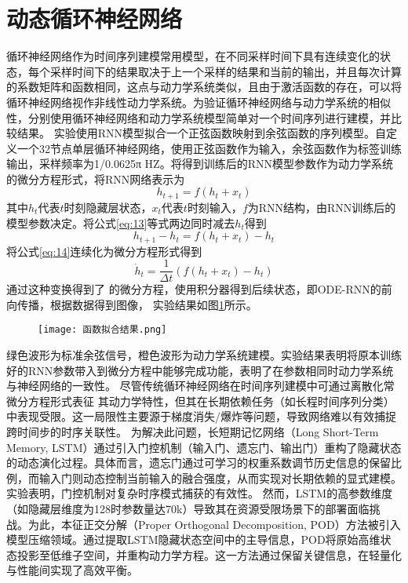 \section{动态循环神经网络}
循环神经网络作为时间序列建模常用模型，在不同采样时间下具有连续变化的状态，每个采样时间下的结果取决于上一个采样的结果和当前的输出，并且每次计算的系数矩阵和函数相同，这点与动力学系统类似，且由于激活函数的存在，可以将循环神经网络视作非线性动力学系统。为验证循环神经网络与动力学系统的相似性，分别使用循环神经网络和动力学系统模型简单对一个时间序列进行建模，并比较结果。
实验使用RNN模型拟合一个正弦函数映射到余弦函数的序列模型。自定义一个32节点单层循环神经网络，使用正弦函数作为输入，余弦函数作为标签训练输出，采样频率为1/0.0625π HZ。将得到训练后的RNN模型参数作为动力学系统的微分方程形式，将RNN网络表示为
\begin{equation}
\label{eq:13}
{h_{t + 1}} = f({h_t} + {x_t})
\end{equation}
其中$h_t$代表$t$时刻隐藏层状态，$x_t$代表$t$时刻输入，$f$为RNN结构，由RNN训练后的模型参数决定。将公式\ref{eq:13}等式两边同时减去$h_t$得到
\begin{equation}
\label{eq:14}
{h_{t + 1}} - {h_t} = f({h_t} + {x_t}) - {h_t}
\end{equation}
将公式\ref{eq:14}连续化为微分方程形式得到
\begin{equation}
\label{eq:15}
  {\dot h_t} = \frac{1}{{\Delta t}}(f({h_t} + {x_t}) - {h_t})
\end{equation}
通过这种变换得到了 的微分方程，使用积分器得到后续状态，即ODE-RNN的前向传播，根据数据得到图像， 实验结果如图\ref{fig:函数拟合结果}所示。
\begin{figure}[!htbp]
  \centering
  \texttt{[image: 函数拟合结果.png]}
  \label{fig:函数拟合结果}
\end{figure}
绿色波形为标准余弦信号，橙色波形为动力学系统建模。实验结果表明将原本训练好的RNN参数带入到微分方程中能够完成功能，表明了在参数相同时动力学系统与神经网络的一致性。
尽管传统循环神经网络在时间序列建模中可通过离散化常微分方程形式表征
其动力学特性，但其在长期依赖任务（如长程时间序列分类）中表现受限。这一局限性主要源于梯度消失/爆炸等问题，导致网络难以有效捕捉跨时间步的时序关联性。
为解决此问题，长短期记忆网络（Long Short-Term Memory, LSTM）\cite{hochreiterLongShorttermMemory1997}通过引入门控机制（输入门、遗忘门、输出门）重构了隐藏状态的动态演化过程。具体而言，遗忘门通过可学习的权重系数调节历史信息的保留比例，而输入门则动态控制当前输入的融合强度，从而实现对长期依赖的显式建模。实验表明，门控机制对复杂时序模式捕获的有效性。
然而，LSTM的高参数维度（如隐藏层维度为128时参数量达70k）导致其在资源受限场景下的部署面临挑战。为此，本征正交分解（Proper Orthogonal Decomposition, POD）方法被引入模型压缩领域。通过提取LSTM隐藏状态空间中的主导信息，POD将原始高维状态投影至低维子空间，并重构动力学方程。这一方法通过保留关键信息，在轻量化与性能间实现了高效平衡。

